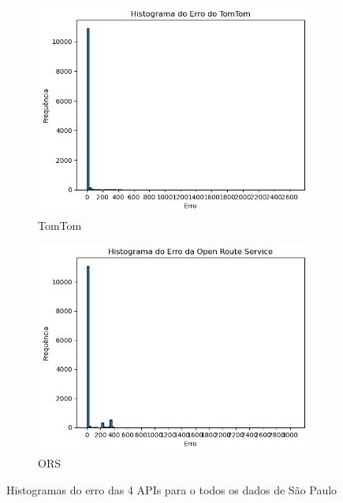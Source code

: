 \begin{figure}[ht]
  \begin{subfigure}[b]{0.45\textwidth}
    \includegraphics[width=\textwidth]{Figuras/histTomtomSP.png}
    \caption{TomTom}
    \label{fig:histtomtom}
  \end{subfigure}
  \hfill
  \begin{subfigure}[b]{0.45\textwidth}
    \includegraphics[width=\textwidth]{Figuras/histOrsSP.png}
    \caption{ORS}
    \label{fig:histors}
  \end{subfigure}
  
  \caption{Histogramas do erro das 4 APIs para o todos os dados de São Paulo}
  \label{fig:hist-global-sp}
\end{figure}


